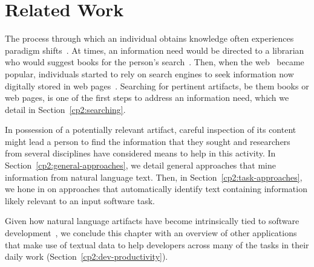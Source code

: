 \setcounter{chapter}{1}


\chapter{Related Work}
\label{ch:related-work}


The process through which an individual 
obtains knowledge often experiences paradigm shifts~\cite{Pirolli1999}. 
At times, 
an information need would be directed to a librarian who would suggest books for the person's search~\cite{saracevic1975}.
Then, when the \acf{web}~\cite{berners1994web} became popular,
individuals started to rely on search engines 
to seek information now digitally stored in web pages~\cite{Page1999}.
Searching for pertinent artifacts, be them books or web pages, 
is one of the first steps to address an information need,
which we detail in Section~\ref{cp2:searching}.




In possession of a potentially relevant artifact, careful 
inspection of its content might lead a person 
to find the information that they sought and
researchers from several 
disciplines have considered means to help 
in this activity. 
In Section~\ref{cp2:general-approaches}, 
we detail general approaches that mine information
from natural language text. 
Then, in Section~\ref{cp2:task-approaches}, 
we hone in on approaches that
automatically identify text 
containing information likely relevant to an input software task.




Given how 
natural language artifacts have become intrinsically
tied to software development~\cite{umarji2008archetypal},
we conclude this chapter with an overview of 
other applications that make use of textual data
to help developers
across many of the tasks in their daily work (Section~\ref{cp2:dev-productivity}).




% 








% 


% 

% 

